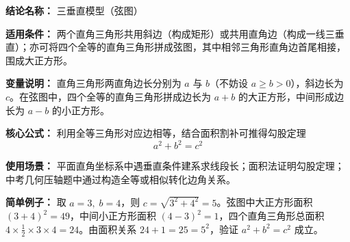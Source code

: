 \textbf{结论名称：} 三垂直模型（弦图）

\textbf{适用条件：} 两个直角三角形共用斜边（构成矩形）或共用直角边（构成一线三垂直）；亦可将四个全等的直角三角形拼成弦图，其中相邻三角形直角边首尾相接，围成大正方形。

\textbf{变量说明：} 直角三角形两直角边长分别为 \(a\) 与 \(b\)（不妨设 \(a\ge b>0\)），斜边长为 \(c\)。在弦图中，四个全等的直角三角形拼成边长为 \(a+b\) 的大正方形，中间形成边长为 \(a-b\) 的小正方形。

\textbf{核心公式：} 利用全等三角形对应边相等，结合面积割补可推得勾股定理
\[
\boxed{a^{2}+b^{2}=c^{2}}
\]

\textbf{使用场景：} 平面直角坐标系中遇垂直条件建系求线段长；面积法证明勾股定理；中考几何压轴题中通过构造全等或相似转化边角关系。

\textbf{简单例子：} 取 \(a=3,\;b=4\)，则 \(c=\sqrt{3^{2}+4^{2}}=5\)。弦图中大正方形面积 \((3+4)^2=49\)，中间小正方形面积 \((4-3)^2=1\)，四个直角三角形总面积 \(4\times\frac{1}{2}\times3\times4=24\)。由面积关系 \(24+1=25=5^{2}\)，验证 \(a^{2}+b^{2}=c^{2}\) 成立。
